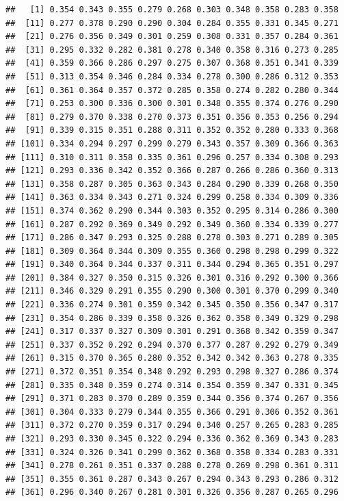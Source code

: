 \documentclass[
]{article}
\begin{document}
\begin{verbatim}
##   [1] 0.354 0.343 0.355 0.279 0.268 0.303 0.348 0.358 0.283 0.358
##  [11] 0.277 0.378 0.290 0.290 0.304 0.284 0.355 0.331 0.345 0.271
##  [21] 0.276 0.356 0.349 0.301 0.259 0.308 0.331 0.357 0.284 0.361
##  [31] 0.295 0.332 0.282 0.381 0.278 0.340 0.358 0.316 0.273 0.285
##  [41] 0.359 0.366 0.286 0.297 0.275 0.307 0.368 0.351 0.341 0.339
##  [51] 0.313 0.354 0.346 0.284 0.334 0.278 0.300 0.286 0.312 0.353
##  [61] 0.361 0.364 0.357 0.372 0.285 0.358 0.274 0.282 0.280 0.344
##  [71] 0.253 0.300 0.336 0.300 0.301 0.348 0.355 0.374 0.276 0.290
##  [81] 0.279 0.370 0.338 0.270 0.373 0.351 0.356 0.353 0.256 0.294
##  [91] 0.339 0.315 0.351 0.288 0.311 0.352 0.352 0.280 0.333 0.368
## [101] 0.334 0.294 0.297 0.299 0.279 0.343 0.357 0.309 0.366 0.363
## [111] 0.310 0.311 0.358 0.335 0.361 0.296 0.257 0.334 0.308 0.293
## [121] 0.293 0.336 0.342 0.352 0.366 0.287 0.266 0.286 0.360 0.313
## [131] 0.358 0.287 0.305 0.363 0.343 0.284 0.290 0.339 0.268 0.350
## [141] 0.363 0.334 0.343 0.271 0.324 0.299 0.258 0.334 0.309 0.336
## [151] 0.374 0.362 0.290 0.344 0.303 0.352 0.295 0.314 0.286 0.300
## [161] 0.287 0.292 0.369 0.349 0.292 0.349 0.360 0.334 0.339 0.277
## [171] 0.286 0.347 0.293 0.325 0.288 0.278 0.303 0.271 0.289 0.305
## [181] 0.309 0.364 0.344 0.309 0.355 0.360 0.298 0.298 0.299 0.322
## [191] 0.340 0.364 0.344 0.337 0.311 0.344 0.294 0.365 0.351 0.297
## [201] 0.384 0.327 0.350 0.315 0.326 0.301 0.316 0.292 0.300 0.366
## [211] 0.346 0.329 0.291 0.355 0.290 0.300 0.301 0.370 0.299 0.340
## [221] 0.336 0.274 0.301 0.359 0.342 0.345 0.350 0.356 0.347 0.317
## [231] 0.354 0.286 0.339 0.358 0.326 0.362 0.358 0.349 0.329 0.298
## [241] 0.317 0.337 0.327 0.309 0.301 0.291 0.368 0.342 0.359 0.347
## [251] 0.337 0.352 0.292 0.294 0.370 0.377 0.287 0.292 0.279 0.349
## [261] 0.315 0.370 0.365 0.280 0.352 0.342 0.342 0.363 0.278 0.335
## [271] 0.372 0.351 0.354 0.348 0.292 0.293 0.298 0.327 0.286 0.374
## [281] 0.335 0.348 0.359 0.274 0.314 0.354 0.359 0.347 0.331 0.345
## [291] 0.371 0.283 0.370 0.289 0.359 0.344 0.356 0.374 0.267 0.356
## [301] 0.304 0.333 0.279 0.344 0.355 0.366 0.291 0.306 0.352 0.361
## [311] 0.372 0.270 0.359 0.317 0.294 0.340 0.257 0.265 0.283 0.285
## [321] 0.293 0.330 0.345 0.322 0.294 0.336 0.362 0.369 0.343 0.283
## [331] 0.324 0.326 0.341 0.299 0.362 0.368 0.358 0.334 0.283 0.331
## [341] 0.278 0.261 0.351 0.337 0.288 0.278 0.269 0.298 0.361 0.311
## [351] 0.355 0.361 0.287 0.343 0.267 0.294 0.343 0.293 0.286 0.312
## [361] 0.296 0.340 0.267 0.281 0.301 0.326 0.356 0.287 0.265 0.296

\end{verbatim}
\end{document}
